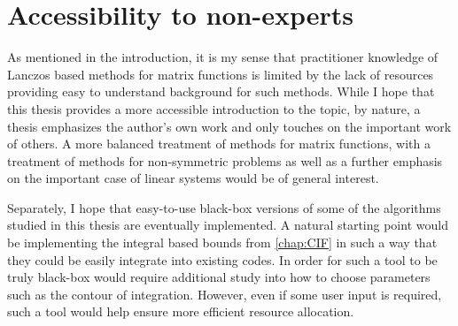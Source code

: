 \section{Accessibility to non-experts}

As mentioned in the introduction, it is my sense that practitioner knowledge of Lanczos based methods for matrix functions is limited by the lack of resources providing easy to understand background for such methods. 
While I hope that this thesis provides a more accessible introduction to the topic, by nature, a thesis emphasizes the author's own work and only touches on the important work of others.
A more balanced treatment of methods for matrix functions, with a treatment of methods for non-symmetric problems as well as a further emphasis on the important case of linear systems would be of general interest.

Separately, I hope that easy-to-use black-box versions of some of the algorithms studied in this thesis are eventually implemented.
A natural starting point would be implementing the integral based bounds from \cref{chap:CIF} in such a way that they could be easily integrate into existing codes.
In order for such a tool to be truly black-box would require additional study into how to choose parameters such as the contour of integration.
However, even if some user input is required, such a tool would help ensure more efficient resource allocation.


